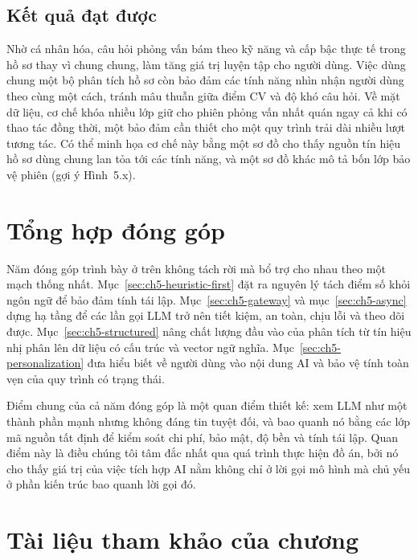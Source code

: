 \documentclass[../DoAn.tex]{subfiles}
\begin{document}
\subsection{Kết quả đạt được}

Nhờ cá nhân hóa, câu hỏi phỏng vấn bám theo kỹ năng và cấp bậc thực tế trong hồ sơ thay vì chung chung, làm tăng giá trị luyện tập cho người dùng. Việc dùng chung một bộ phân tích hồ sơ còn bảo đảm các tính năng nhìn nhận người dùng theo cùng một cách, tránh mâu thuẫn giữa điểm CV và độ khó câu hỏi. Về mặt dữ liệu, cơ chế khóa nhiều lớp giữ cho phiên phỏng vấn nhất quán ngay cả khi có thao tác đồng thời, một bảo đảm cần thiết cho một quy trình trải dài nhiều lượt tương tác. Có thể minh họa cơ chế này bằng một sơ đồ cho thấy nguồn tín hiệu hồ sơ dùng chung lan tỏa tới các tính năng, và một sơ đồ khác mô tả bốn lớp bảo vệ phiên (gợi ý Hình~5.x).

\section{Tổng hợp đóng góp}
\label{sec:ch5-summary}

Năm đóng góp trình bày ở trên không tách rời mà bổ trợ cho nhau theo một mạch thống nhất. Mục~\ref{sec:ch5-heuristic-first} đặt ra nguyên lý tách điểm số khỏi ngôn ngữ để bảo đảm tính tái lập. Mục~\ref{sec:ch5-gateway} và mục~\ref{sec:ch5-async} dựng hạ tầng để các lần gọi LLM trở nên tiết kiệm, an toàn, chịu lỗi và theo dõi được. Mục~\ref{sec:ch5-structured} nâng chất lượng đầu vào của phân tích từ tín hiệu nhị phân lên dữ liệu có cấu trúc và vector ngữ nghĩa. Mục~\ref{sec:ch5-personalization} đưa hiểu biết về người dùng vào nội dung AI và bảo vệ tính toàn vẹn của quy trình có trạng thái.

Điểm chung của cả năm đóng góp là một quan điểm thiết kế: xem LLM như một thành phần mạnh nhưng không đáng tin tuyệt đối, và bao quanh nó bằng các lớp mã nguồn tất định để kiểm soát chi phí, bảo mật, độ bền và tính tái lập. Quan điểm này là điều chúng tôi tâm đắc nhất qua quá trình thực hiện đồ án, bởi nó cho thấy giá trị của việc tích hợp AI nằm không chỉ ở lời gọi mô hình mà chủ yếu ở phần kiến trúc bao quanh lời gọi đó.

\section*{Tài liệu tham khảo của chương}
\end{document}
